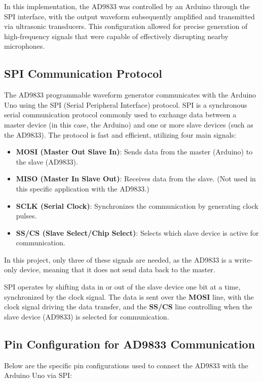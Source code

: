 In this implementation, the AD9833 was controlled by an Arduino through the SPI interface, with the output waveform subsequently amplified and transmitted via ultrasonic transducers. This configuration allowed for precise generation of high-frequency signals that were capable of effectively disrupting nearby microphones.

\subsection{SPI Communication Protocol}

The AD9833 programmable waveform generator communicates with the Arduino Uno using the SPI (Serial Peripheral Interface) protocol. SPI is a synchronous serial communication protocol commonly used to exchange data between a master device (in this case, the Arduino) and one or more slave devices (such as the AD9833). The protocol is fast and efficient, utilizing four main signals:

\begin{itemize}
    \item \textbf{MOSI (Master Out Slave In)}: Sends data from the master (Arduino) to the slave (AD9833).
    \item \textbf{MISO (Master In Slave Out)}: Receives data from the slave. (Not used in this specific application with the AD9833.)
    \item \textbf{SCLK (Serial Clock)}: Synchronizes the communication by generating clock pulses.
    \item \textbf{SS/CS (Slave Select/Chip Select)}: Selects which slave device is active for communication.
\end{itemize}

In this project, only three of these signals are needed, as the AD9833 is a write-only device, meaning that it does not send data back to the master.

SPI operates by shifting data in or out of the slave device one bit at a time, synchronized by the clock signal. The data is sent over the \textbf{MOSI} line, with the clock signal driving the data transfer, and the \textbf{SS/CS} line controlling when the slave device (AD9833) is selected for communication.

\subsection{Pin Configuration for AD9833 Communication}

Below are the specific pin configurations used to connect the AD9833 with the Arduino Uno via SPI:

